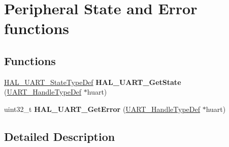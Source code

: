 \hypertarget{group___u_a_r_t___exported___functions___group4}{}\section{Peripheral State and Error functions}
\label{group___u_a_r_t___exported___functions___group4}
\subsection*{Functions}
\begin{DoxyCompactItemize}
\item 
\mbox{\label{group___u_a_r_t___exported___functions___group4_ga8fcec96f9d249f41ecf0c7598ab421e5}} 
\hyperlink{group___u_a_r_t___exported___types_gaf55d844a35379c204c90be5d1e8e50ba}{H\+A\+L\+\_\+\+U\+A\+R\+T\+\_\+\+State\+Type\+Def} {\bfseries H\+A\+L\+\_\+\+U\+A\+R\+T\+\_\+\+Get\+State} (\hyperlink{struct_u_a_r_t___handle_type_def}{U\+A\+R\+T\+\_\+\+Handle\+Type\+Def} $\ast$huart)
\item 
\mbox{\label{group___u_a_r_t___exported___functions___group4_ga6c5f93a76a0bd01ad2d1351adddfa63f}} 
uint32\+\_\+t {\bfseries H\+A\+L\+\_\+\+U\+A\+R\+T\+\_\+\+Get\+Error} (\hyperlink{struct_u_a_r_t___handle_type_def}{U\+A\+R\+T\+\_\+\+Handle\+Type\+Def} $\ast$huart)
\end{DoxyCompactItemize}


\subsection{Detailed Description}

